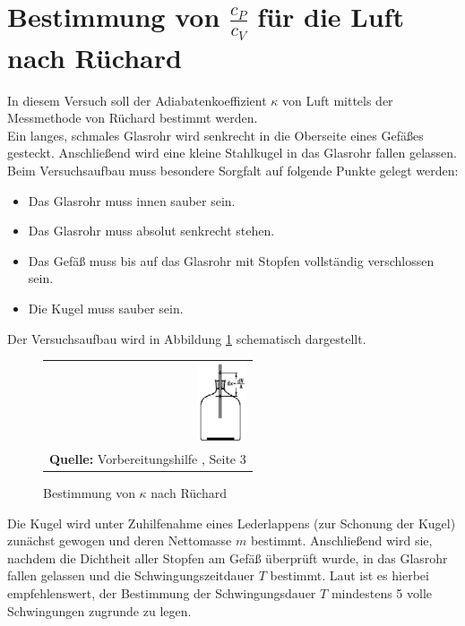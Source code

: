 \documentclass[a4paper,titlepage]{scrartcl}
\numberwithin{equation}{section}
\begin{document}
\section{Bestimmung von $\frac{c_P}{c_V}$ für die Luft nach Rüchard}
In diesem Versuch soll der Adiabatenkoeffizient $\kappa$ von Luft mittels der Messmethode von Rüchard bestimmt werden.\\
Ein langes, schmales Glasrohr wird senkrecht in die Oberseite eines Gefäßes gesteckt. Anschließend wird eine kleine Stahlkugel in das Glasrohr fallen gelassen.\\
Beim Versuchsaufbau muss besondere Sorgfalt auf folgende Punkte gelegt werden:
\begin{itemize}
\item Das Glasrohr muss innen sauber sein.
\item Das Glasrohr muss absolut senkrecht stehen.
\item Das Gefäß muss bis auf das Glasrohr mit Stopfen vollständig verschlossen sein.
\item Die Kugel muss sauber sein.
\end{itemize}
Der Versuchsaufbau wird in Abbildung \ref{fig:ruechard} schematisch dargestellt.
\begin{figure}[H]
	\centering
	\begin{tabular}{@{}r@{}}
		\includegraphics[width=0.25\textwidth]{Bilder/methode-ruechard.JPG}\\
		\footnotesize\sffamily\textbf{Quelle:} Vorbereitungshilfe \cite{vorbereitungshilfe}, Seite 3
	\end{tabular}
	\caption{Bestimmung von $\kappa$ nach Rüchard}
	\label{fig:ruechard}
\end{figure}
Die Kugel wird unter Zuhilfenahme eines Lederlappens (zur Schonung der Kugel) zunächst gewogen und deren Nettomasse $m$ bestimmt. Anschließend wird sie, nachdem die Dichtheit aller Stopfen am Gefäß überprüft wurde, in das Glasrohr fallen gelassen und die Schwingungszeitdauer $T$ bestimmt. Laut \cite{walcher} ist es hierbei empfehlenswert, der Bestimmung der Schwingungsdauer $T$ mindestens 5 volle Schwingungen zugrunde zu legen.\\
\end{document}
